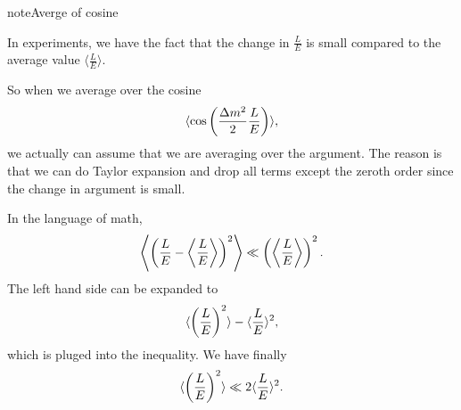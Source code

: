 \documentclass[letterpaper,12pt,english]{sphinxmanual}
\begin{document}
\begin{notice}{note}{Averge of cosine}

In experiments, we have the fact that the change in \(\frac{L}{E}\) is small compared to the average value \(\langle\frac{L}{E}\rangle\).

So when we average over the cosine
\begin{gather}
\begin{split}\langle \cos \left( \frac{\Delta m^2}{2} \frac{L}{E}  \right) \rangle,\end{split}\notag
\end{gather}
we actually can assume that we are averaging over the argument. The reason is that we can do Taylor expansion and drop all terms except the zeroth order since the change in argument is small.

In the language of math,
\begin{gather}
\begin{split}\left\langle  \left( \frac{L}{E} - \left\langle \frac{L}{E} \right\rangle  \right)^2 \right\rangle \ll \left( \left\langle \frac{L}{E} \right\rangle  \right)^2.\end{split}\notag
\end{gather}
The left hand side can be expanded to
\begin{gather}
\begin{split}\langle \left(\frac{L}{E} \right)^2 \rangle - \langle \frac{L}{E}\rangle^2,\end{split}\notag
\end{gather}
which is pluged into the inequality. We have finally
\begin{gather}
\begin{split}\langle \left(\frac{L}{E} \right)^2 \rangle \ll 2\langle \frac{L}{E}\rangle^2.\end{split}\notag
\end{gather}\end{notice}
\end{document}
